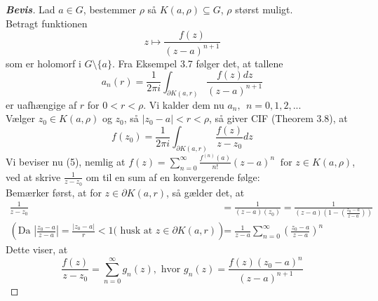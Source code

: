 \documentclass[10pt,a4paper]{article}
\theoremstyle{definition}
\begin{document}
\newpage
\begin{proof}[\textbf{Bevis}]
Lad $a \in G$, bestemmer $\rho$ så $K(a,\rho) \subseteq G$, $\rho$ størst muligt. \\
Betragt funktionen 
$$ z \mapsto \frac{f(z)}{(z-a)^{n+1}}$$
som er holomorf i $G \setminus \{a\}$. Fra Eksempel 3.7 følger det, at tallene
$$ a_n (r) = \frac{1}{2 \pi i} \int_{\partial K(a,r)} \frac{f(z) dz}{(z-a)^{n+1}} $$
er uafhængige af $r$ for $0 < r < \rho$. Vi kalder dem nu $a_n, \ \ n= 0,1,2,...$ \\

Vælger $z_0 \in K(a,\rho)$ og $z_0$, så $\left| z_0 - a \right| < r < \rho$, så giver CIF (Theorem 3.8), at
$$ f(z_0) = \frac{1}{2 \pi i} \int_{\partial K(a,r)} \frac{f(z)}{z-z_0}dz$$
Vi beviser nu (5), nemlig at $f(z)= \sum\limits_{n=0}^\infty \frac{f^{(n)}(a)}{n!} (z-a)^n \ \text{ for } z \in K(a,\rho)$, ved at skrive $\frac{1}{z-z_0}$ om til en sum af en konvergerende følge: \\

Bemærker først, at for $z \in \partial K(a,r)$, så gælder det, at
\begin{align*}
\frac{1}{z-z_0} &= \frac{1}{(z-a)(z_0)} = \frac{1}{(z-a)(1- (\frac{z_0-a}{z-a}))} \\
\left( \text{Da } \left|\frac{z_0-a}{z-a} \right| = \frac{\left|z_0-a \right|}{r} < 1 (\text{ husk at } z \in \partial K(a,r) \right)
&= \frac{1}{z-a} \sum_{n=0}^\infty \left(\frac{z_0-a}{z-a}\right)^n
\end{align*}
Dette viser, at
$$ \frac{f(z)}{z-z_0} = \sum_{n=0}^\infty g_n(z), \text{ hvor } g_n(z) = \frac{f(z)(z_0-a)^n}{(z-a)^{n+1}}$$


\end{proof}
\end{document}
